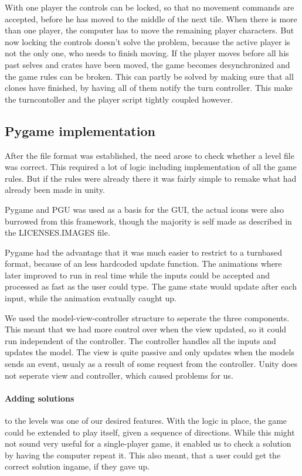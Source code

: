 With one player the controls can be locked, so that no movement commands
are accepted, before he has moved to the middle of the next tile. When
there is more than one player, the computer has to move the remaining player
characters. But now locking the controls doesn't solve the problem,
because the active player is not the only one, who needs to finish
moving. If the player moves before all his past selves and crates have
been moved, the game becomes desynchronized and the game rules can be
broken. This can partly be solved by making sure that all clones have
finished, by having all of them notify the turn controller. This make
the turncontoller and the player script tightly coupled however.

\subsection{Pygame implementation}
After the file format was established, the need arose to check whether
a level file was correct. This required a lot of logic including
implementation of all the game rules. But if the rules were already there
it was fairly simple to remake what had already been made in unity.

Pygame and PGU was used as a basis for the GUI, the actual icons were
also burrowed from this framework, though the majority is self made as
described in the LICENSES.IMAGES file.

Pygame had the advantage that it was much easier to restrict to a
turnbased format, because of an less hardcoded update function. The
animations where later improved to run in real time while the inputs could 
be accepted and processed as fast as the user could type. The game state
would update after each input, while the animation evatually caught up.

We used the model-view-controller structure to seperate the three
components. This meant that we had more control over when the view
updated, so it could run independent of the controller. The controller
handles all the inputs and updates the model. The view is quite passive
and only updates when the models sends an event, usualy as a result
 of some request from the controller. Unity does not seperate view
 and controller, which caused problems for us.

\paragraph{Adding solutions}
to the levels was one of our desired features. With the logic in place,
the game could be extended to play itself, given a sequence of directions.
While this might not sound very useful for a single-player game, it enabled
us to check a solution by having the computer repeat it. This also meant,
that a user could get the correct solution ingame, if they gave up.

